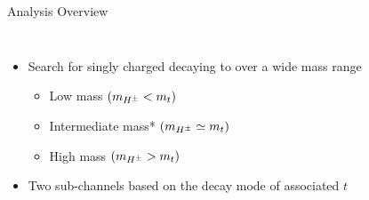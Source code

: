 \documentclass[aspectratio=169,xcolor=table]{beamer}
\begin{document}


\section{\HpmLong }
  
  \begin{frame}[t]{Analysis Overview}
      \begin{columns}[t]

        \vspace{-20mm}
        \begin{itemize}
          \item Search for singly charged \Hpm decaying to \taunu over a wide mass range
            \begin{itemize}
              \item Low mass $ (m_{H^{\pm}} < m_{t})$
              \item Intermediate mass*  $(m_{H^{\pm}} \simeq m_{t})$
              \item High mass $(m_{H^{\pm}} > m_{t})$
            \end{itemize}

          \item Two sub-channels based on the decay mode of associated $t$ 
          \vspace{-.25cm}
          \begin{table}
            \end{table}
          

\end{itemize}
\end{columns}
\end{frame}
\end{document}
